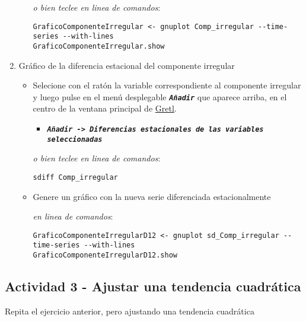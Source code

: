 \documentclass[11pt]{article}
\begin{document}
\begin{enumerate}
\begin{itemize}
{\vspace{1pt} \footnotesize \color{gray!70!black}
\emph{o bien teclee en linea de comandos}:
\begin{verbatim}
GraficoComponenteIrregular <- gnuplot Comp_irregular --time-series --with-lines
GraficoComponenteIrregular.show
\end{verbatim}
}
\end{itemize}

\item Gráfico de la diferencia estacional del componente irregular
\label{sec:org4b3668c}

\begin{itemize}
\item Selecione con el ratón la variable correspondiente al componente
irregular y luego pulse en el menú desplegable \textbf{\emph{\texttt{Añadir}}} que
aparece arriba, en el centro de la ventana principal de \href{https://gretl.sourceforge.net/es.html}{Gretl}.
\begin{itemize}
\item \textbf{\emph{\texttt{Añadir -> Diferencias estacionales de las variables
      seleccionadas}}}
\end{itemize}

{\vspace{0pt} \footnotesize \color{gray!70!black}
\emph{o bien teclee en linea de comandos}: 
\begin{verbatim}
sdiff Comp_irregular
\end{verbatim}
}

\item Genere un gráfico con la nueva serie diferenciada estacionalmente

{\vspace{0pt} \footnotesize \color{gray!70!black}
\emph{en linea de comandos}: 
\begin{verbatim}
GraficoComponenteIrregularD12 <- gnuplot sd_Comp_irregular --time-series --with-lines
GraficoComponenteIrregularD12.show
\end{verbatim}
}
\end{itemize}
\end{enumerate}


\subsection{Actividad 3 - Ajustar una tendencia cuadrática}
\label{sec:orgca6a3d1}

Repita el ejercicio anterior, pero ajustando una tendencia cuadrática
\end{document}
